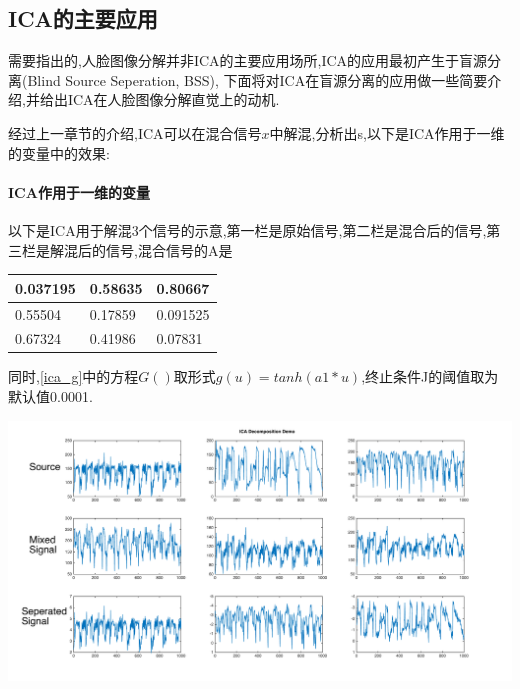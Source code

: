 \subsection{ICA的主要应用}
需要指出的,人脸图像分解并非ICA的主要应用场所,ICA的应用最初产生于盲源分离(Blind Source Seperation, BSS), 下面将对ICA在盲源分离的应用做一些简要介绍,并给出ICA在人脸图像分解直觉上的动机.\newline

经过上一章节的介绍,ICA可以在混合信号$x$中解混,分析出s,以下是ICA作用于一维的变量中的效果:
	\paragraph{ICA作用于一维的变量}	
	以下是ICA用于解混3个信号的示意,第一栏是原始信号,第二栏是混合后的信号,第三栏是解混后的信号,混合信号的A是
	\begin{center}
	\begin{tabular}{|l|l|l|}
\hline
0.037195&0.58635&0.80667\\\hline
0.55504&0.17859&0.091525\\\hline
0.67324&0.41986&0.07831\\\hline
\end{tabular}
\end{center}

同时,\ref{ica_g}中的方程$G()$取形式$g(u)=tanh(a1*u)$,终止条件J的阈值取为默认值0.0001.

\begin{center}
\begin{minipage}[t]{\linewidth}
\center
{
\includegraphics[width=\textwidth]{Img/ica_decom.pdf} 
\label{fig:icadecom}
}
\end{minipage}
\medskip
\end{center}

